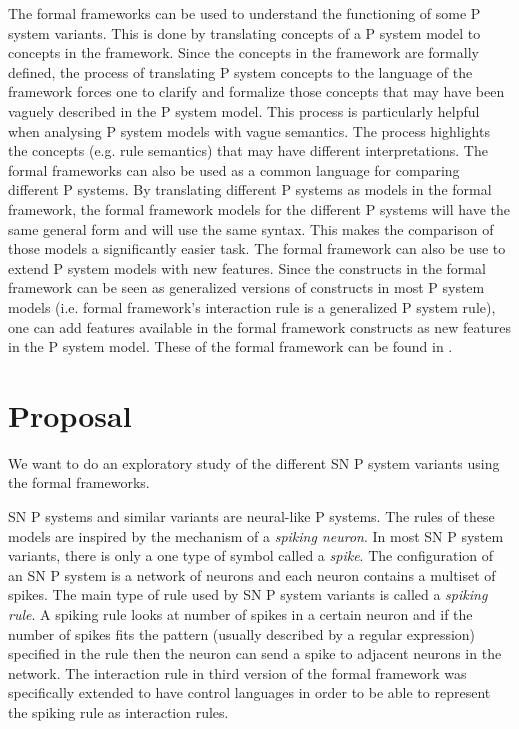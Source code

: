 \documentclass[12pt,A4]{article}
\begin{document}
The formal frameworks can be used to understand the functioning of some P system variants. This is
done by translating concepts of a P system model to concepts in the framework.
Since the concepts in the framework are formally defined, the process of translating
P system concepts to the language of the framework forces one to clarify and formalize
those concepts that may have been vaguely described in the P system model. This process
is particularly helpful when analysing P system models with vague semantics. The process highlights
the concepts (e.g. rule semantics) that may have different interpretations. The formal frameworks
can also be used as a common language for comparing different P systems. By translating different
P systems as models in the formal framework, the formal framework models for the different P systems
will have the same general form and will use the same syntax. This makes the comparison of those
models a significantly easier task. The formal framework can also be use to extend P system models
with new features. Since the constructs in the formal framework can be seen as generalized versions
of constructs in most P system models (i.e. formal framework's interaction rule is a generalized
P system rule), one can add features available in the formal framework constructs as new features in
the P system model. These of the formal framework can be found in \cite{verlan-2014-ff-use}.


\section{Proposal}

We want to do an exploratory study of the different SN P system variants using the formal 
frameworks.

SN P systems and similar variants are neural-like P systems. The rules of these models are inspired 
by the mechanism of a \emph{spiking neuron}. In most SN P system variants, there is only a one type 
of symbol called a \emph{spike}. The configuration of an SN P system is a network of neurons and 
each neuron contains a multiset of spikes. The main type of rule used by SN P system variants is
called a \emph{spiking rule}. A spiking rule looks at number of spikes in a certain neuron and if 
the number of spikes fits the pattern (usually described by a regular expression) specified in the 
rule then the neuron can send a spike to adjacent neurons in the network. The interaction rule in 
third version of the formal framework \cite{verlan-2020-ff-snp} was specifically extended to have 
control languages in order to be able to represent the spiking rule as interaction rules.
\end{document}
